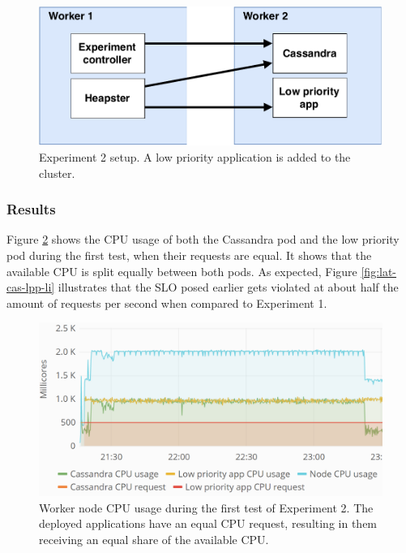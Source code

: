 \begin{figure}
\centering
\includegraphics[width=0.60\columnwidth]{Images/Experiments/Experiment_2.pdf}
\caption{Experiment 2 setup. A low priority application is added to the cluster.}
\label{fig:experiment2}
\end{figure}

\subsubsection{Results}
Figure \ref{fig:cpu-cas-lpp-li} shows the CPU usage of both the Cassandra pod and the low priority pod during the first test, when their requests are equal. It shows that the available CPU is split equally between both pods. As expected, Figure \ref{fig:lat-cas-lpp-li} illustrates that the SLO posed earlier gets violated at about half the amount of requests per second when compared to Experiment 1. \\

\begin{figure}
\centering
\includegraphics[width=0.90\columnwidth]{Images/Experiments/CPU/Grafana/cpu-cas-lpp-li.PNG}
\caption{Worker node CPU usage during the first test of Experiment 2. The deployed applications have an equal CPU request, resulting in them receiving an equal share of the available CPU.}
\label{fig:cpu-cas-lpp-li}
\end{figure}

